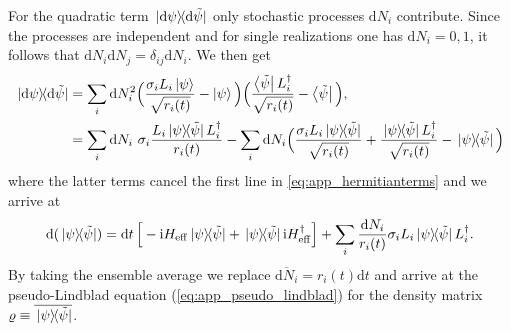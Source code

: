 \documentclass[twocolumn,prl,superscriptaddress]{revtex4-2}
\renewcommand{\i}{\mathrm i}
\begin{document}
For the quadratic term $\dyad*{\mathrm d \psi}{\mathrm d \tilde \psi}$ only stochastic processes $\mathrm d N_i$ contribute. Since the processes are independent and for single realizations one has $\mathrm dN_i=0,1$, it follows that $\mathrm dN_i \mathrm dN_j = \delta_{ij}\mathrm dN_i$. We then get
\begin{align}
	\begin{split}
		\dyad*{\mathrm d \psi}{\mathrm d \tilde \psi} & = \sum_i \mathrm dN_i^2 \Big(\frac{\sigma_iL_i \ket{\psi} }{\sqrt{ r_i(t)}} - \ket{\psi} \Big)\Big(\frac{ \bra{\tilde \psi}L_i^\dagger }{\sqrt{ r_i(t)}} - \bra{\tilde \psi} \Big) , \\&= \sum_i \mathrm dN_i\ \sigma_i \frac{L_i \dyad*{ \psi}{\tilde\psi} L_i^\dagger}{ r_i(t)} - \sum_i \mathrm dN_i \Big(\frac{\sigma_i L_i \dyad*{ \psi}{\tilde\psi}}{\sqrt{ r_i(t)}} + \frac{\dyad*{ \psi}{\tilde\psi} L_i^\dagger  }{\sqrt{ r_i(t)}} - \dyad*{ \psi}{\tilde\psi} \Big)
	\end{split}
\end{align}
where the latter terms cancel the first line in \cref{eq:app_hermitianterms} and we arrive at
\begin{align}
	\mathrm d (\dyad*{ \psi}{ \tilde\psi}) =\mathrm dt\, \Big[- \i H_\mathrm{eff} \dyad*{ \psi}{ \tilde\psi} + \dyad*{ \psi}{ \tilde\psi} \i H_\mathrm{eff}^\dagger\Big] +  \sum_i  \frac{\mathrm dN_i }{ r_i(t) } \sigma_i L_i\dyad*{ \psi}{ \tilde\psi} L_i^\dagger .
\end{align}
By taking the ensemble average we replace $\overline { \mathrm d N_i }= r_i(t) \mathrm d t$ and arrive at the pseudo-Lindblad equation (\ref{eq:app_pseudo_lindblad}) for the density matrix $\varrho \equiv \overline{\dyad*{ \psi}{ \tilde\psi}}$.
\end{document}
